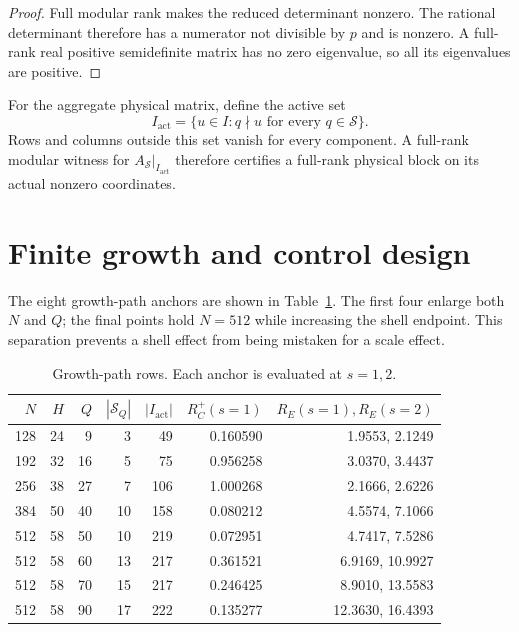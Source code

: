 \documentclass[11pt]{article}
\newcommand{\shell}{\mathcal S}
\newcommand{\activeset}{I_{\mathrm{act}}}
\begin{document}
\begin{proof}
Full modular rank makes the reduced determinant nonzero.  The rational
determinant therefore has a numerator not divisible by $p$ and is nonzero.
A full-rank real positive semidefinite matrix has no zero eigenvalue, so all
its eigenvalues are positive.
\end{proof}

For the aggregate physical matrix, define the active set
\begin{equation}
 \activeset=\{u\in I:q\nmid u\text{ for every }q\in\shell\}.
 \label{eq:active}
\end{equation}
Rows and columns outside this set vanish for every component.  A full-rank
modular witness for $A_{\shell}|_{\activeset}$ therefore certifies a full-rank
physical block on its actual nonzero coordinates.

\section{Finite growth and control design}

The eight growth-path anchors are shown in Table~\ref{tab:path}.  The first
four enlarge both $N$ and $Q$; the final points hold $N=512$ while increasing
the shell endpoint.  This separation prevents a shell effect from being
mistaken for a scale effect.

\begin{table}[H]
\centering
\small
\caption{Growth-path rows.  Each anchor is evaluated at $s=1,2$.}
\label{tab:path}
\begin{tabular}{rrrrrrr}
\toprule
$N$ & $H$ & $Q$ & $|\shell_Q|$ & $|\activeset|$ & $R_C^+(s=1)$ & $R_E(s=1),R_E(s=2)$\\
\midrule
128 & 24 & 9  & 3  & 49  & 0.160590 & 1.9553, 2.1249\\
192 & 32 & 16 & 5  & 75  & 0.956258 & 3.0370, 3.4437\\
256 & 38 & 27 & 7  & 106 & 1.000268 & 2.1666, 2.6226\\
384 & 50 & 40 & 10 & 158 & 0.080212 & 4.5574, 7.1066\\
512 & 58 & 50 & 10 & 219 & 0.072951 & 4.7417, 7.5286\\
512 & 58 & 60 & 13 & 217 & 0.361521 & 6.9169, 10.9927\\
512 & 58 & 70 & 15 & 217 & 0.246425 & 8.9010, 13.5583\\
512 & 58 & 90 & 17 & 222 & 0.135277 & 12.3630, 16.4393\\
\bottomrule
\end{tabular}
\end{table}
\end{document}
